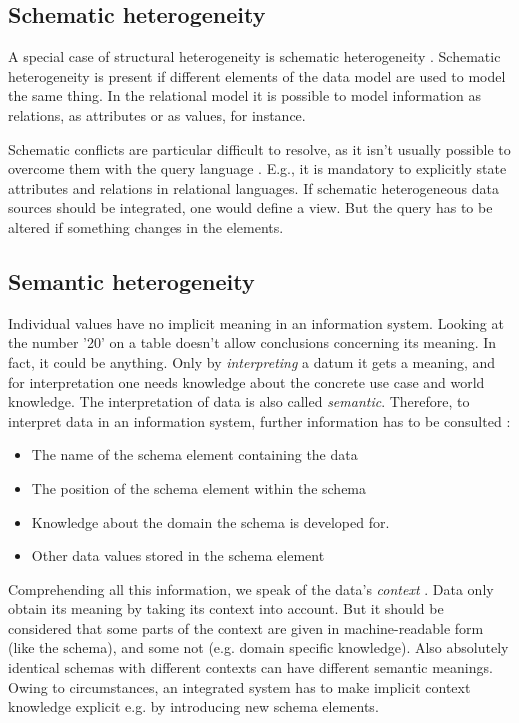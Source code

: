 \subsection{Schematic  heterogeneity}
A special case of structural heterogeneity is schematic heterogeneity \cite[p. 67]{DBLP:books/dp/LeserN2006}. Schematic heterogeneity is present if different elements of the data model are used to model the same thing. In the relational model it is possible to model information as relations, as attributes or as values, for instance. 

Schematic conflicts are particular difficult to resolve, as it isn't usually possible to overcome them with the query language \cite[p. 68]{DBLP:books/dp/LeserN2006}. E.g., it is mandatory to explicitly state attributes and relations in relational languages. If schematic heterogeneous data sources should be integrated, one would define a view. But the query has to be altered if something changes in the elements.

\subsection{Semantic  heterogeneity}
Individual values have no implicit meaning in an information system. Looking at the number '20' on a table doesn't allow conclusions concerning its meaning. In fact, it could be anything. Only by \textit{interpreting} a datum it gets a meaning, and for interpretation one needs knowledge about the concrete use case and world knowledge. The interpretation of data is also called \textit{semantic}. Therefore, to interpret data in an information system, further information has to be consulted \cite[p. 73]{DBLP:books/dp/LeserN2006}:
\begin{itemize}
\item The name of the schema element containing the data
\item The position of the schema element within the schema
\item Knowledge about the domain the schema is developed for.
\item Other data values stored in the schema element
\end{itemize}
Comprehending all this information, we speak of the data's \textit{context} \cite[p. 74]{DBLP:books/dp/LeserN2006}. 
Data only obtain its meaning by taking its context into account. But it should be considered that some parts of the context are given in machine-readable form (like the schema), and some not (e.g. domain specific knowledge). 
Also absolutely identical schemas with different contexts can have different semantic meanings. Owing to circumstances, an integrated system has to make implicit context knowledge explicit e.g. by introducing new schema elements.

